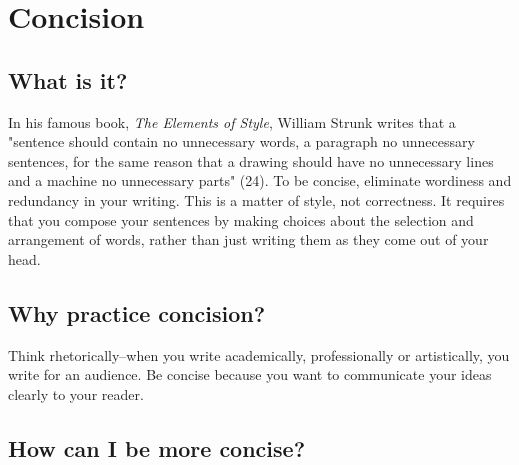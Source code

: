 \chapter{Concision}
 
\section{What is it?}
 
In his famous book, \emph{The Elements of Style}, William Strunk writes that a "sentence 
should contain no unnecessary words, a paragraph no unnecessary sentences, for the 
same reason that a drawing should have no unnecessary lines and a machine no 
unnecessary parts" (24). To be concise, eliminate wordiness and redundancy in your 
writing. This is a matter of style, not correctness. It requires that you compose your 
sentences by making choices about the selection and arrangement of words, rather 
than just writing them as they come out of your head.
 
\section{Why practice concision?}
 
Think rhetorically--when you write academically, professionally or artistically, you write 
for an audience. Be concise because you want to communicate your ideas clearly to 
your reader.
 
\section{How can I be more concise?}
 
